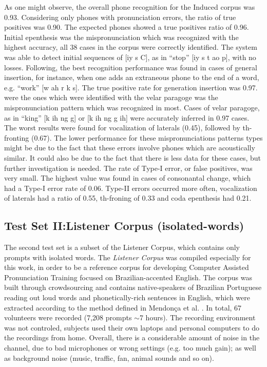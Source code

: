 \documentclass[twocolumn]{bmcart}%
\begin{document}
As one might observe, the overall phone recognition for the Induced corpus was 0.93. Considering only phones with pronunciation errors, the ratio of true positives was 0.90. The expected phones showed a true positives ratio of 0.96. Initial epenthesis was the mispronunciation which was recognized with the highest accuracy, all 38 cases in the corpus were correctly identified. The system was able to detect initial sequences of [iy s C], as in ``stop'' [iy s t ao p], with no losses. Following, the best recognition performance was found in cases of general insertion, for instance, when one adds an extraneous phone to the end of a word, e.g. ``work'' [w ah r k s]. The true positive rate for generation insertion was 0.97. were the ones which were identified with the  velar paragoge was the mispronunciation pattern which was recognized in most. Cases of velar paragoge, as in ``king'' [k ih ng g] or [k ih ng g ih] were accurately inferred in 0.97 cases. The worst results were found for vocalization of laterals (0.45), followed by th-fronting (0.67). The lower performance for these mispronunciations patterns types might be due to the fact that these errors involve phones which are acoustically similar. It could also be due to the fact that there is less data for these cases, but further investigation is needed. The rate of Type-I error, or false positives, was very small. The highest value was found in cases of consonantal change, which had a Type-I error rate of 0.06. Type-II errors occurred more often, vocalization of laterals had a ratio of 0.55, th-froning of 0.33 and coda epenthesis had 0.21.

\subsection{Test Set II:Listener Corpus (isolated-words)}\label{corpus-listener-w}

The second test set is a subset of the Listener Corpus, which contains only prompts with isolated words. The \emph{Listener Corpus} was compiled especially for this work, in order to be a reference corpus for developing Computer Assisted Pronunciation Training focused on Brazilian-accented English. The corpus was built through crowdsourcing and contains native-speakers of Brazilian Portuguese reading out loud words and phonetically-rich sentences in English, which were extracted according to the method defined in Mendon\c{c}a et al. \cite{Mendonca2014}. In total, 67 volunteers were recorded (7,208 prompts $\sim$7 hours). The recording environment was not controled, subjects used their own laptops and personal computers to do the recordings from home. Overall, there is a considerable amount of noise in the channel, due to bad microphones or wrong settings (e.g. too much gain); as well as background noise (music, traffic, fan, animal sounds and so on). 
\end{document}
